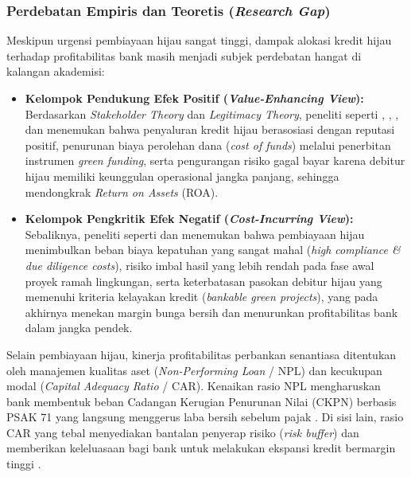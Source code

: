 \documentclass[12pt,a4paper]{article}
\numberwithin{equation}{section}
\begin{document}
\subsubsection*{Perdebatan Empiris dan Teoretis (\emph{Research Gap})}
\noindent
Meskipun urgensi pembiayaan hijau sangat tinggi, dampak alokasi kredit hijau terhadap profitabilitas bank masih menjadi subjek perdebatan hangat di kalangan akademisi:
\begin{itemize}
  \item \textbf{Kelompok Pendukung Efek Positif (\emph{Value-Enhancing View}):} Berdasarkan \emph{Stakeholder Theory} dan \emph{Legitimacy Theory}, peneliti seperti \citet{Pramono2022}, \citet{Yin2021}, \citet{SariAstuti2023}, dan \citet{Sun2021} menemukan bahwa penyaluran kredit hijau berasosiasi dengan reputasi positif, penurunan biaya perolehan dana (\emph{cost of funds}) melalui penerbitan instrumen \emph{green funding}, serta pengurangan risiko gagal bayar karena debitur hijau memiliki keunggulan operasional jangka panjang, sehingga mendongkrak \emph{Return on Assets} (ROA).
  \item \textbf{Kelompok Pengkritik Efek Negatif (\emph{Cost-Incurring View}):} Sebaliknya, peneliti seperti \citet{Akomea2022} dan \citet{Zhang2022} menemukan bahwa pembiayaan hijau menimbulkan beban biaya kepatuhan yang sangat mahal (\emph{high compliance \& due diligence costs}), risiko imbal hasil yang lebih rendah pada fase awal proyek ramah lingkungan, serta keterbatasan pasokan debitur hijau yang memenuhi kriteria kelayakan kredit (\emph{bankable green projects}), yang pada akhirnya menekan margin bunga bersih dan menurunkan profitabilitas bank dalam jangka pendek.
\end{itemize}

\noindent
Selain pembiayaan hijau, kinerja profitabilitas perbankan senantiasa ditentukan oleh manajemen kualitas aset (\emph{Non-Performing Loan} / NPL) dan kecukupan modal (\emph{Capital Adequacy Ratio} / CAR). Kenaikan rasio NPL mengharuskan bank membentuk beban Cadangan Kerugian Penurunan Nilai (CKPN) berbasis PSAK 71 yang langsung menggerus laba bersih sebelum pajak \citep{KuncoroSuhardjono2018, PraditaSyaichu2022}. Di sisi lain, rasio CAR yang tebal menyediakan bantalan penyerap risiko (\emph{risk buffer}) dan memberikan keleluasaan bagi bank untuk melakukan ekspansi kredit bermargin tinggi \citep{BrighamEhrhardt2020, LestariPurnomo2023}.
\end{document}
